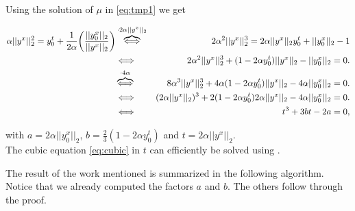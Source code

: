 \begin{enumerate}
                Using the solution of $\mu$ in \ref{eq:tmp1} we get

                \begin{eqnarray}
                    \alpha ||y^{x}||_{2}^{2} = y_{0}^{t} + \frac{1}{2 \alpha} \bigg( \frac{||y_{0}^{x}||_{2}}{||y^{x}||_{2}} \bigg) &\overbrace{\Longleftrightarrow}^{\cdot 2 \alpha ||y^{x}||_{2}}& 2 \alpha^{2} ||y^{x}||_{2}^{3} = 2 \alpha ||y^{x}||_{2} y_{0}^{t} + ||y_{0}^{x}||_{2} - 1 \notag \\
                    &\Longleftrightarrow& 2 \alpha^{2} ||y^{x}||_{2}^{3} + (1 - 2 \alpha y_{0}^{t}) ||y^{x}||_{2} - ||y_{0}^{x}||_{2} = 0. \notag \\ 
                    &\overbrace{\Longleftrightarrow}^{\cdot 4 \alpha}& 8 \alpha^{3} ||y^{x}||_{2}^{3} + 4 \alpha (1 - 2 \alpha y_{0}^{t}) ||y^{x}||_{2} - 4 \alpha ||y_{0}^{x}||_{2} = 0. \notag \\
                    &\Longleftrightarrow& (2 \alpha ||y^{x}||_{2})^{3} + 2 (1 - 2 \alpha y_{0}^{t}) 2 \alpha ||y^{x}||_{2} - 4 \alpha ||y_{0}^{x}||_{2} = 0. \notag \\
                    &\Longleftrightarrow& t^{3} + 3bt - 2a = 0, \label{eq:cubic}
                \end{eqnarray}

                with $a = 2 \alpha ||y_{0}^{x}||_{2}$, $b = \frac{2}{3}(1 - 2 \alpha y_{0}^{t})$ and $t = 2 \alpha ||y^{x}||_{2}$.\\
                The cubic equation \ref{eq:cubic} in $t$ can efficiently be solved using \cite{kelvey-ajp}.

                \end{enumerate}

                The result of the work mentioned is summarized in the following algorithm. Notice that we already computed the factors $a$ and $b$. The others follow through the proof.



